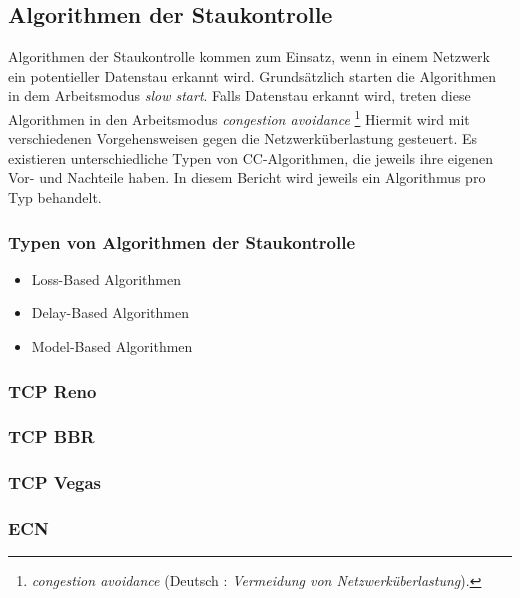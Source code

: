\documentclass[paper=a4,fontsize=12pt,ngerman]{scrartcl}
\begin{document}
\subsection{Algorithmen der Staukontrolle }

Algorithmen der Staukontrolle kommen zum Einsatz, wenn in einem Netzwerk ein potentieller Datenstau erkannt wird.
Grundsätzlich starten die Algorithmen in dem Arbeitsmodus \textit{slow start}.
Falls Datenstau erkannt wird, treten diese Algorithmen in den Arbeitsmodus \textit{congestion avoidance}
\footnote{\textit{congestion avoidance} (Deutsch : \textit{Vermeidung von Netzwerküberlastung}).}
 Hiermit wird mit verschiedenen Vorgehensweisen gegen die Netzwerküberlastung gesteuert. 
\newline
Es existieren unterschiedliche Typen von CC-Algorithmen, die jeweils ihre eigenen Vor- und Nachteile haben.
In diesem Bericht wird jeweils ein Algorithmus pro Typ behandelt.

\subsubsection{Typen von Algorithmen der Staukontrolle}


    \begin{itemize}
        \item Loss-Based Algorithmen
        
        
        \item Delay-Based Algorithmen
        
        \item Model-Based Algorithmen
    \end{itemize}


\subsubsection{TCP Reno}

\subsubsection{TCP BBR} 

\subsubsection{TCP Vegas}

\subsubsection{ECN}
\end{document}
